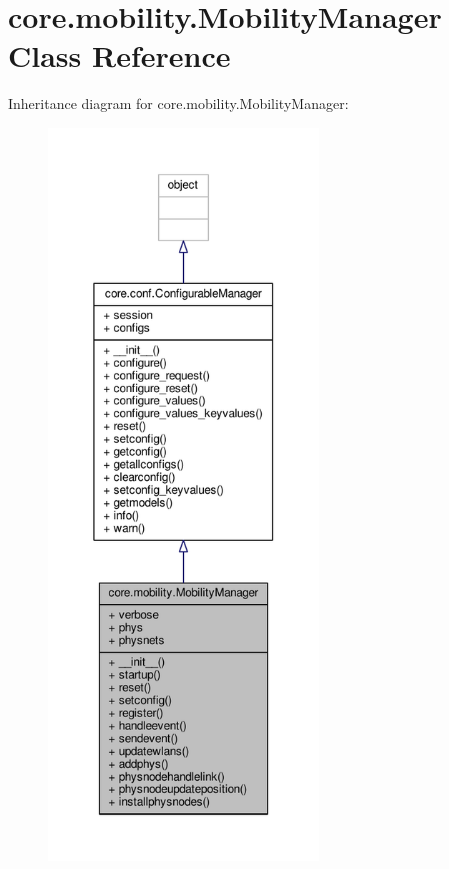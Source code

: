 \hypertarget{classcore_1_1mobility_1_1_mobility_manager}{\section{core.\+mobility.\+Mobility\+Manager Class Reference}
\label{classcore_1_1mobility_1_1_mobility_manager}
}


Inheritance diagram for core.\+mobility.\+Mobility\+Manager\+:
\nopagebreak
\begin{figure}[H]
\begin{center}
\leavevmode
\includegraphics[height=550pt]{classcore_1_1mobility_1_1_mobility_manager__inherit__graph}
\end{center}
\end{figure}


